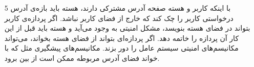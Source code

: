\begin{itemize}
	\item [5] 
	با اینکه کاربر و هسته صفحه آدرس مشترکی دارند، هسته باید بازه‌ی آدرس درخواستی کاربر را چک کند که خارج از فضای کاربر نباشد. اگر پردازه‌ی کاربر بتواند در فضای هسته بنویسد، مشکل امنیتی به وجود می‌آید و هسته باید قبل از این کار آن پردازه را خاتمه دهد. اگر پردازه‌ای بتواند از فضای هسته بخواند، می‌تواند مکانیسم‌های امنیتی سیستم عامل را دور بزند. مکانیسم‌های پیشگیری مثل  که با خواند فضای آدرس مربوطه ممکن است از بین برود.
\end{itemize}